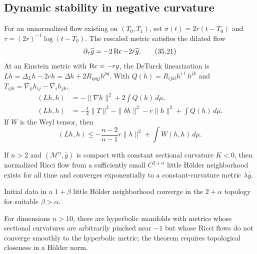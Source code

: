 \subsection{Dynamic stability in negative curvature}

For an unnormalized flow existing on $(T_0,T_1)$, set
$\sigma(t)=2r(t-T_0)$ and $\tau=(2r)^{-1}\log(t-T_0)$.  The rescaled metric
satisfies the dilated flow
\begin{equation*}
 \partial_\tau\widetilde g=-2\operatorname{Rc}-2r\widetilde g.
 \tag{35.21}
\end{equation*}
At an Einstein metric with $\operatorname{Rc}=-rg$, the DeTurck linearization is
$Lh=\Delta_Lh-2rh=\Delta h+2R_{ipqj}h^{pq}$.  With
$Q(h)=R_{ijkl}h^{i\ell}h^{jk}$ and
$T_{ijk}=\nabla_kh_{ij}-\nabla_ih_{jk}$,
\begin{align*}
 (Lh,h)&=-\|\nabla h\|^2+2\int Q(h)\,d\mu, \tag{35.22}\\
 (Lh,h)&=-\tfrac12\|T\|^2-\|\delta h\|^2-r\|h\|^2+\int Q(h)\,d\mu. \tag{35.23}
\end{align*}
If $W$ is the Weyl tensor, then
\begin{equation*}
 (Lh,h)\le -\frac{n-2}{n-1}r\|h\|^2+\int W(h,h)\,d\mu.
 \tag{35.24}
\end{equation*}

\begin{theorem}
\label{thm:chow-iv-negative-curvature-stability}
If $n>2$ and $(\mathcal M^n,\bar g)$ is compact with constant sectional
curvature $K<0$, then normalized Ricci flow from a sufficiently small
$C^{2+\alpha}$ little H\"older neighborhood exists for all time and converges
exponentially to a constant-curvature metric $\lambda\bar g$.
\end{theorem}

\begin{remark}
\label{rem:chow-iv-negative-curvature-regularity}
Initial data in a $1+\beta$ little H\"older neighborhood converge in the
$2+\alpha$ topology for suitable $\beta>\alpha$.
\end{remark}

\begin{remark}
\label{rem:chow-iv-negative-curvature-obstruction}
For dimensions $n>10$, there are hyperbolic manifolds with metrics whose
sectional curvatures are arbitrarily pinched near $-1$ but whose Ricci flows
do not converge smoothly to the hyperbolic metric; the theorem requires
topological closeness in a H\"older norm.
\end{remark}

